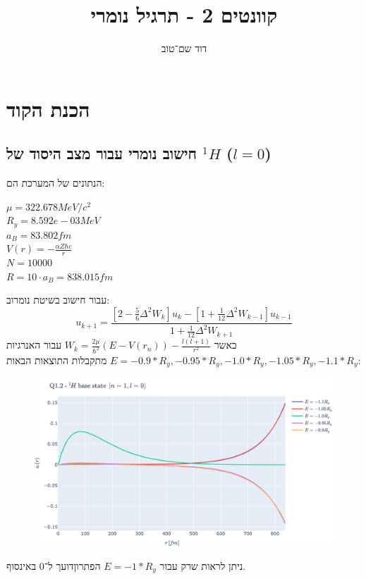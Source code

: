 \documentclass{article}
\title{קוונטים 2 - תרגיל נומרי}
\author{דוד שם־טוב}
\begin{document}
\maketitle

\section{הכנת הקוד}
\subsection{חישוב נומרי עבור מצב היסוד של ${}^{1}\!H$ ($l=0$)}
הנתונים של המערכת הם:
\begin{multicols}{3}
    $\mu = 322.678 MeV / c^2$ \\
    $R_y = 8.592e-03 MeV$ \\
    $a_B = 83.802 fm$ \\
    $V(r) = -\frac{\alpha Z \hbar c}{r}$ \\
    $N = 10000$ \\
    $R = 10\cdot a_B = 838.015 fm$
\end{multicols}
עבור חישוב בשיטת נומרוב:
$$u_{k+1} = \frac{\left[2-\frac{5}{6}\Delta^2W_k\right]u_k-\left[1+\frac{1}{12}\Delta^2W_{k-1}\right]u_{k-1}}{1+\frac{1}{12}\Delta^2W_{k+1}}$$
כאשר $W_k = \frac{2\mu}{\hbar^2}\left(E-V\left(r_n\right)\right) - \frac{l(l+1)}{r^2}$
עבור האנרגיות $ E = -0.9 * R_y, -0.95 * R_y, -1.0 * R_y, -1.05 * R_y, -1.1 * R_y$ מתקבלות התוצאות הבאות:
\begin{figure}\label{fig:1.2}
    \centering
    \includegraphics[width=\linewidth]{plots/1.2.pdf}
\end{figure}
ניתן לראות שרק עבור $E = -1 * R_y$ הפתרוןדועך ל־0 באינסוף.
\end{document}
